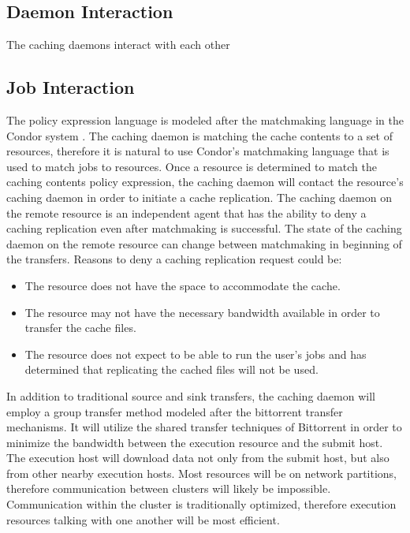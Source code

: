 \subsection{Daemon Interaction}

The caching daemons interact with each other


\subsection{Job Interaction}





The policy expression language is modeled after the matchmaking language in the Condor system \cite{raman1998matchmaking}.  The caching daemon is matching the cache contents to a set of resources, therefore it is natural to use Condor's matchmaking language that is used to match jobs to resources.  Once a resource is determined to match the caching contents policy expression, the caching daemon will contact the resource's caching daemon in order to initiate a cache replication.  The caching daemon on the remote resource is an independent agent that has the ability to deny a caching replication even after matchmaking is successful.  The state of the caching daemon on the remote resource can change between matchmaking in beginning of the transfers.  Reasons to deny a caching replication request could be:

\begin{itemize}
\item The resource does not have the space to accommodate the cache.
\item The resource may not have the necessary bandwidth available in order to transfer the cache files.
\item The resource does not expect to be able to run the user's jobs and has determined that replicating the cached files will not be used.
\end{itemize}

In addition to traditional source and sink transfers, the caching daemon will employ a group transfer method modeled after the bittorrent \cite{cohen2008bittorrent} transfer mechanisms.  It will utilize the shared transfer techniques of Bittorrent in order to minimize the bandwidth between the execution resource and the submit host.  The execution host will download data not only from the submit host, but also from other nearby execution hosts.  Most resources will be on network partitions, therefore communication between clusters will likely be impossible.  Communication within the cluster is traditionally optimized, therefore execution resources talking with one another will be most efficient.

